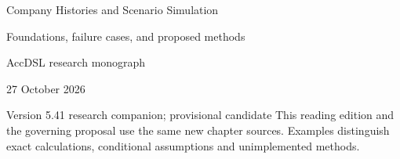 \documentclass[11pt,a4paper]{report}
\begin{document}
\hypersetup{pageanchor=false}
\begin{titlepage}
{\Huge Company Histories and Scenario Simulation\par}
\vspace{12mm}
{\Large Foundations, failure cases, and proposed methods\par}
\vspace{8mm}
AccDSL research monograph\par 27 October 2026\par Version 5.41 research companion; provisional candidate
\vfill
This reading edition and the governing proposal use the same new chapter sources. Examples distinguish exact calculations, conditional assumptions and unimplemented methods.
\end{titlepage}
\hypersetup{pageanchor=true}
\tableofcontents
\clearpage{}


























\clearpage\label{sim:body-end}

\begingroup\raggedright
\endgroup
\end{document}
